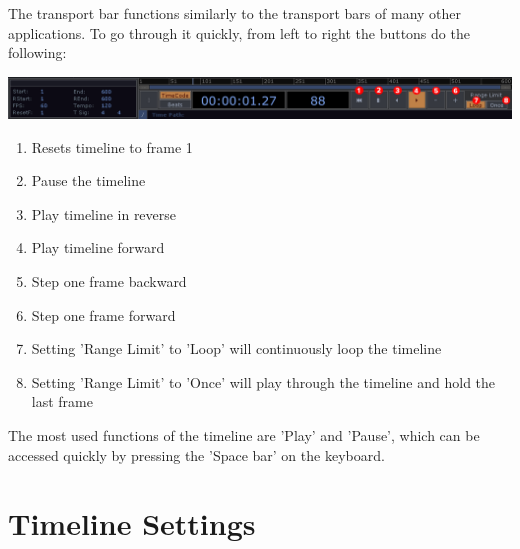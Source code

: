 \begin{fullwidth}

The transport bar functions similarly to the transport bars of many other applications. To go through it quickly, from left to right the buttons do the following:

\begin{center}
\includegraphics{./img/2.3/transport-1.png}
\end{center}

\begin{enumerate}
\item Resets timeline to frame 1
\item Pause the timeline
\item Play timeline in reverse
\item Play timeline forward
\item Step one frame backward
\item Step one frame forward
\item Setting 'Range Limit' to 'Loop' will continuously loop the timeline
\item Setting 'Range Limit' to 'Once' will play through the timeline and hold the last frame
\end{enumerate}

The most used functions of the timeline are 'Play' and 'Pause', which can be accessed quickly by pressing the 'Space bar' on the keyboard.

\end{fullwidth}
\section{Timeline Settings}

